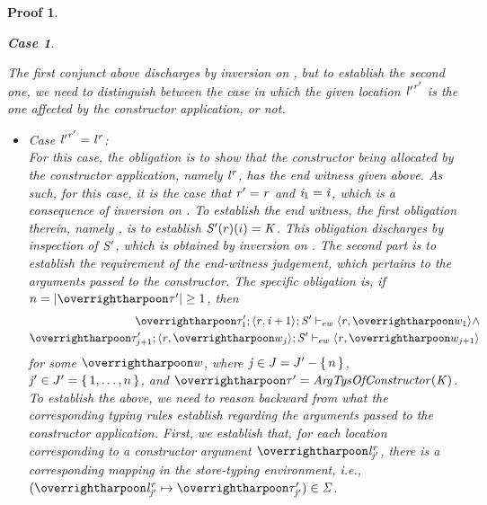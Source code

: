 \documentclass[showabstract,showacknowledgments,showpreface,showdedication]{iuphd}
\newtheorem*{bcase}{Case}
\theoremstyle{nonumberplain}
\newtheorem{nproof}{Proof}
\begin{document}
\begin{nproof}
\begin{bcase}
\begin{itemize}
\begin{itemize}
      The first conjunct above discharges
      by inversion on \ddatacon{}, but
      to establish the second one, we need to distinguish
      between the case in which the given location ${\mathit{l}'}^{\mathit{r}'}$ is the one
      affected by the constructor application, or not.
      \begin{itemize}
      \item Case ${\mathit{l}'}^{\mathit{r}'} = {\mathit{l}}^{\mathit{r}}$: \\
        For this case, the obligation is to show that the constructor being
        allocated by the constructor application, namely ${\mathit{l}}^{\mathit{r}}$,
        has the end witness given above.
        As such, for this case, it is the case that $\mathit{r}' = \mathit{r}$ and $\mathit{i}_1 = \mathit{i}$, which is
        a consequence of inversion on \ddatacon{}.
        To establish the end witness, the first obligation therein, namely ,
        is to establish $\mathit{S}'(r)(i) = \mathit{K}$.
        This obligation discharges by inspection of $\mathit{S}'$, which is obtained by inversion on \ddatacon{}.
        The second part is to establish the requirement
         of the end-witness
        judgement, which pertains to the arguments passed to the constructor.
        The specific obligation is, if $n = | \overharpoon{\TYP'} | \geq 1$, then
           \begin{align}
           \ewitness{\overharpoon{\TYP'_1}}{\concreteloc{\reg}{\ind + 1}{}}{\STOR'}{\concreteloc{\reg}{\overharpoon{w_1}}{}} \wedge \label{prf:ew-req1} \\
           \ewitness{\overharpoon{\TYP'_{j+1}}}{\concreteloc{\reg}{\overharpoon{w_j}}{}}{\STOR'}{\concreteloc{\reg}{\overharpoon{w_{j+1}}}{}} \label{prf:ew-req2} 
           \end{align}
           for some $\overharpoon{w}$, where 
           $\mathit{j} \in J = J' - \{ \, n \,\}$, $\mathit{j}' \in J' = \{ \, 1,\ldots,n \,\}$, and
           $\overharpoon{\TYP'} = \kargtys(\DC)$. 
           To establish the above, we need
           to reason backward from what
           the corresponding typing rules establish regarding the
           arguments passed to the constructor application.
           First, we establish that, for each location corresponding to a constructor argument 
           $\overharpoon{\locreg{\loc}{\reg}_{\indj'}}$,
           there is a corresponding mapping in the store-typing environment, i.e.,
           $(\overharpoon{\locreg{\loc}{\reg}_{\indj'}} \mapsto \overharpoon{\TYP_{\indj'}'}) \in \SENV$.

\end{itemize}
\end{itemize}
\end{itemize}
\end{bcase}
\end{nproof}
\end{document}
